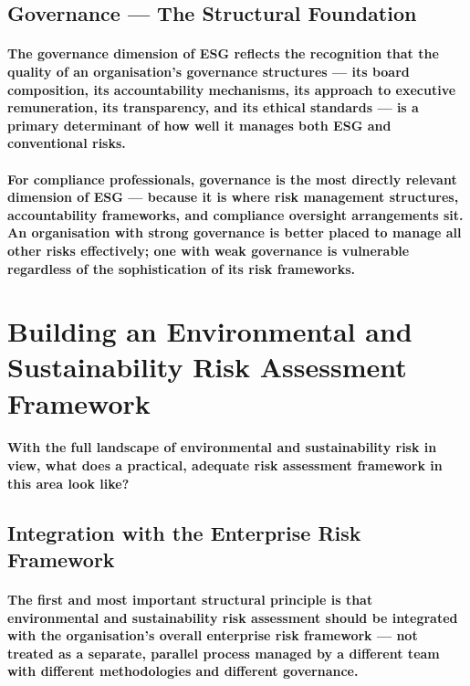 \subsection{Governance — The Structural Foundation}
\paragraph{The governance dimension of ESG reflects the recognition that the quality of an organisation's governance structures — its board composition, its accountability mechanisms, its approach to executive remuneration, its transparency, and its ethical standards — is a primary determinant of how well it manages both ESG and conventional risks.}
\paragraph{For compliance professionals, governance is the most directly relevant dimension of ESG — because it is where risk management structures, accountability frameworks, and compliance oversight arrangements sit. An organisation with strong governance is better placed to manage all other risks effectively; one with weak governance is vulnerable regardless of the sophistication of its risk frameworks.}

\section{Building an Environmental and Sustainability Risk Assessment Framework}
\paragraph{With the full landscape of environmental and sustainability risk in view, what does a practical, adequate risk assessment framework in this area look like?}

\subsection{Integration with the Enterprise Risk Framework}
\paragraph{The first and most important structural principle is that environmental and sustainability risk assessment should be \textbf{integrated} with the organisation's overall enterprise risk framework — not treated as a separate, parallel process managed by a different team with different methodologies and different governance.}
